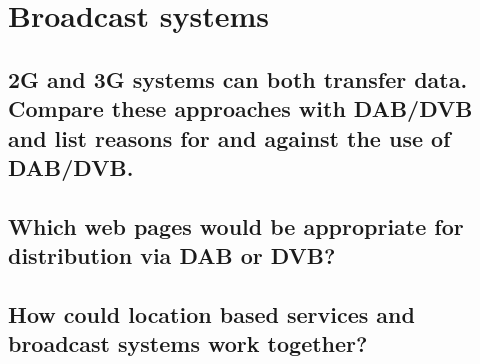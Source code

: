 \section{Broadcast systems}

\subsection{2G and 3G systems can both transfer data. Compare these approaches with
DAB/DVB and list reasons for and against the use of DAB/DVB.}

\subsection{Which web pages would be appropriate for distribution via DAB or DVB?}

\subsection{How could location based services and broadcast systems work together?}




